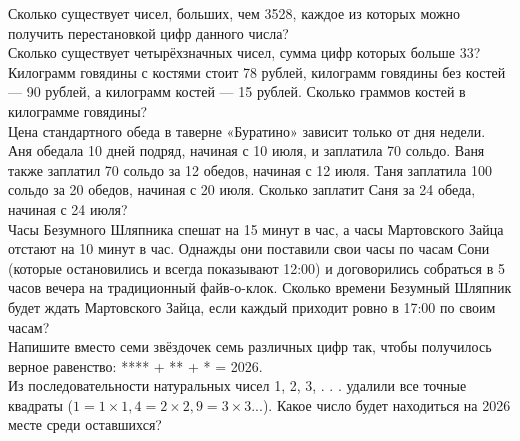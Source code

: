  Сколько существует чисел, больших, чем 3528, каждое из которых можно получить перестановкой цифр данного числа?\\






 Сколько существует четырёхзначных чисел, сумма цифр которых больше 33?\\



 Килограмм говядины с костями стоит 78 рублей,
килограмм говядины без костей — 90 рублей, а килограмм костей — 15 рублей. Сколько граммов
костей в килограмме говядины?
\\


  Цена стандартного обеда в таверне «Буратино» зависит только от дня недели. Аня обедала 10 дней подряд, начиная с 10 июля, и
заплатила 70 сольдо. Ваня также заплатил 70 сольдо за 12 обедов, начиная с 12 июля. Таня
заплатила 100 сольдо за 20 обедов, начиная с 20 июля. Сколько заплатит Саня за 24 обеда,
начиная с 24 июля?
\\

 Часы Безумного Шляпника спешат на 15 минут
в час, а часы Мартовского Зайца отстают на 10 минут в час. Однажды они поставили свои часы
по часам Сони (которые остановились и всегда показывают 12:00) и договорились собраться
в 5 часов вечера на традиционный файв-о-клок. Сколько времени Безумный Шляпник будет
ждать Мартовского Зайца, если каждый приходит ровно в 17:00 по своим часам?\\

 Напишите вместо семи звёздочек семь различных цифр так, чтобы
получилось верное равенство: **** + ** + * = 2026.\\

 Из последовательности натуральных
чисел 1, 2, 3, . . . удалили все точные квадраты ($1=1\times1,4=2\times2,9=3\times3...$). Какое число будет
находиться на 2026 месте среди оставшихся?






